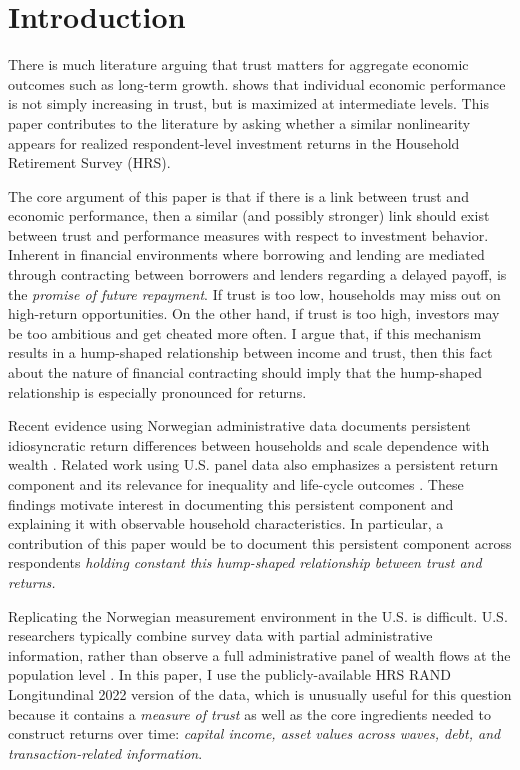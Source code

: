 \onlyinsubfile{\setcounter{section}{0}}
\section{Introduction}
\label{sec:chapter2-intro}

\par There is much literature \parencite{Algan2010} arguing that trust matters for aggregate economic outcomes such as long-term growth. \cite{jbpglg2016} shows that individual economic performance is not simply increasing in trust, but is maximized at intermediate levels. This paper contributes to the literature by asking whether a similar nonlinearity appears for realized respondent-level investment returns in the Household Retirement Survey (HRS).

\par The core argument of this paper is that if there is a link between trust and economic performance, then a similar (and possibly stronger) link should exist between trust and performance measures with respect to investment behavior. Inherent in financial environments where borrowing and lending are mediated through contracting between borrowers and lenders regarding a delayed payoff, is the \textit{promise of future repayment}. If trust is too low, households may miss out on high-return opportunities. On the other hand, if trust is too high, investors may be too ambitious and get cheated more often. I argue that, if this  mechanism results in a hump-shaped relationship between income and trust, then this fact about the nature of financial contracting should imply that the hump-shaped relationship is especially pronounced for returns. 

\par  Recent evidence using Norwegian administrative data documents persistent idiosyncratic return differences between households and scale dependence with wealth \cite{aflgdmlp20}. Related work using U.S. panel data also emphasizes a persistent return component and its relevance for inequality and life-cycle outcomes \cite{Daminato2024}. These findings motivate interest in documenting this persistent component and explaining it with observable household characteristics. In particular, a contribution of this paper would be to document this persistent component across respondents \textit{holding constant this hump-shaped relationship between trust and returns.}

\par Replicating the Norwegian measurement environment in the U.S. is difficult. U.S. researchers typically combine survey data with partial administrative information, rather than observe a full administrative panel of wealth flows at the population level \cite{Kennickell2017b}. In this paper, I use the publicly-available HRS RAND Longitundinal 2022 version of the data, which is unusually useful for this question because it contains a \textit{measure of trust} as well as the core ingredients needed to construct returns over time: \textit{capital income, asset values across waves, debt, and transaction-related information}.

